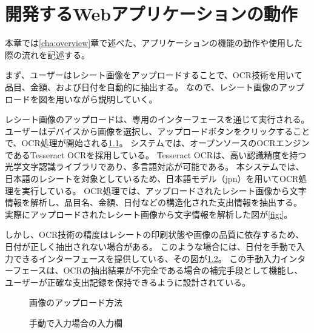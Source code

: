 \documentclass[main]{subfiles}
\begin{document}
\chapter{開発するWebアプリケーションの動作}
\label{cha:motion}
本章では\ref{cha:overview}章で述べた、アプリケーションの機能の動作や使用した際の流れを記述する。

まず、ユーザーはレシート画像をアップロードすることで、OCR技術を用いて品目、金額、および日付を自動的に抽出する。
なので、レシート画像のアップロードを図を用いながら説明していく。

レシート画像のアップロードは、専用のインターフェースを通じて実行される。
ユーザーはデバイスから画像を選択し、アップロードボタンをクリックすることで、OCR処理が開始される\ref{fig:upload}。
システムでは、オープンソースのOCRエンジンであるTesseract OCRを採用している。
Tesseract OCRは、高い認識精度を持つ光学文字認識ライブラリであり、多言語対応が可能である。
本システムでは、日本語のレシートを対象としているため、日本語モデル（jpn）を用いてOCR処理を実行している。
OCR処理では、アップロードされたレシート画像から文字情報を解析し、品目名、金額、日付などの構造化された支出情報を抽出する。
実際にアップロードされたレシート画像から文字情報を解析した図が\ref{fig:}。



しかし、OCR技術の精度はレシートの印刷状態や画像の品質に依存するため、日付が正しく抽出されない場合がある。
このような場合には、日付を手動で入力できるインターフェースを提供している、その図が\ref{fig:input}。
この手動入力インターフェースは、OCRの抽出結果が不完全である場合の補完手段として機能し、
ユーザーが正確な支出記録を保持できるように設計されている。

\begin{figure}[tb]
    \begin{center}
        \caption{画像のアップロード方法}
        \label{fig:upload}
    \end{center}
\end{figure}

\begin{figure}[tb]
    \begin{center}
        \caption{手動で入力場合の入力欄}
        \label{fig:input}
    \end{center}
\end{figure}
\end{document}
